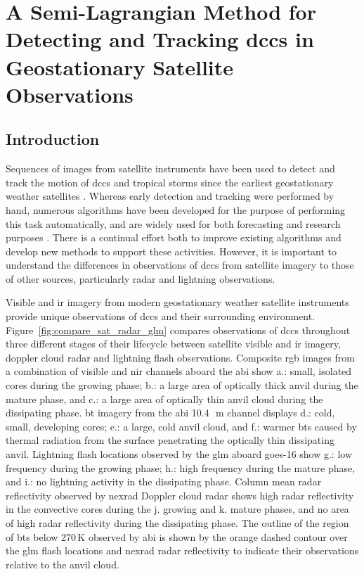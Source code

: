 \chapter{A Semi-Lagrangian Method for Detecting and Tracking \acrshort{dcc}s in Geostationary Satellite Observations} \label{chp:tracking_method}


\section{Introduction} %


Sequences of images from satellite instruments have been used to detect and track the motion of \acrshort{dcc}s and tropical storms since the earliest geostationary weather satellites \citep{menzel_cloud_2001}.
Whereas early detection and tracking were performed by hand, numerous algorithms have been developed for the purpose of performing this task automatically, and are widely used for both forecasting and research purposes \citep[e.g.][]{mecikalski_use_2011, senf_characterization_2015, senf_satellite-based_2017, feng_life_2012, feng_spatiotemporal_2019, zinner_cb-tram_2008}.
There is a continual effort both to improve existing algorithms and develop new methods to support these activities.
However, it is important to understand the differences in observations of \acrshort{dcc}s from satellite imagery to those of other sources, particularly radar and lightning observations.

Visible and \acrshort{ir} imagery from modern geostationary weather satellite instruments provide unique observations of \acrshort{dcc}s and their surrounding environment.
Figure~\ref{fig:compare_sat_radar_glm} compares observations of \acrshort{dcc}s throughout three different stages of their lifecycle between satellite visible and \acrshort{ir} imagery, doppler cloud radar and lightning flash observations.
Composite \acrfull{rgb} images from a combination of visible and \acrshort{nir} channels aboard the \acrshort{abi} show a.: small, isolated cores during the growing phase; b.: a large area of optically thick anvil during the mature phase, and c.: a large area of optically thin anvil cloud during the dissipating phase.
\acrshort{bt} imagery from the \acrshort{abi} 10.4\,\unit{\mu m} channel displays d.: cold, small, developing cores; e.: a large, cold anvil cloud, and f.: warmer \acrshort{bt}s caused by thermal radiation from the surface penetrating the optically thin dissipating anvil. 
Lightning flash locations observed by the \acrfull{glm} aboard \acrshort{goes}-16 show g.: low frequency during the growing phase; h.: high frequency during the mature phase, and i.: no lightning activity in the dissipating phase. 
Column mean radar reflectivity observed by \acrfull{nexrad} Doppler cloud radar shows high radar reflectivity in the convective cores during the j. growing and k. mature phases, and no area of high radar reflectivity during the dissipating phase. 
The outline of the region of \acrshort{bt}s below 270\,\unit{K} observed by \acrshort{abi} is shown by the orange dashed contour over the \acrshort{glm} flash locations and \acrshort{nexrad} radar reflectivity to indicate their observations relative to the anvil cloud.


